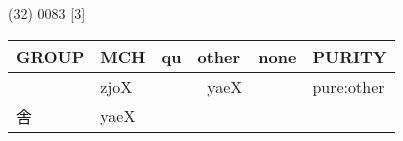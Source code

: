 \documentclass[14pt,a4paper]{scrartcl}
\begin{document}
(32) 0083 {[}3{]}

\begin{longtable}[c]{@{}llllll@{}}
\toprule
\begin{minipage}[b]{0.14\columnwidth}\raggedright\strut
GROUP
\strut\end{minipage} &
\begin{minipage}[b]{0.14\columnwidth}\raggedright\strut
MCH
\strut\end{minipage} &
\begin{minipage}[b]{0.14\columnwidth}\raggedright\strut
qu
\strut\end{minipage} &
\begin{minipage}[b]{0.14\columnwidth}\raggedright\strut
other
\strut\end{minipage} &
\begin{minipage}[b]{0.14\columnwidth}\raggedright\strut
none
\strut\end{minipage} &
\begin{minipage}[b]{0.14\columnwidth}\raggedright\strut
PURITY
\strut\end{minipage}\tabularnewline
\midrule
\endhead
\begin{minipage}[t]{0.14\columnwidth}\raggedright\strut
𡐨
\strut\end{minipage} &
\begin{minipage}[t]{0.14\columnwidth}\raggedright\strut
zjoX
\strut\end{minipage} &
\begin{minipage}[t]{0.14\columnwidth}\raggedright\strut
\strut\end{minipage} &
\begin{minipage}[t]{0.14\columnwidth}\raggedright\strut
𡐨 yaeX
\strut\end{minipage} &
\begin{minipage}[t]{0.14\columnwidth}\raggedright\strut
\strut\end{minipage} &
\begin{minipage}[t]{0.14\columnwidth}\raggedright\strut
pure:other
\strut\end{minipage}\tabularnewline
\begin{minipage}[t]{0.14\columnwidth}\raggedright\strut
舎
\strut\end{minipage} &
\begin{minipage}[t]{0.14\columnwidth}\raggedright\strut
yaeX
\strut\end{minipage} &
\begin{minipage}[t]{0.14\columnwidth}\raggedright\strut
\strut\end{minipage} &

\end{longtable}
\end{document}
